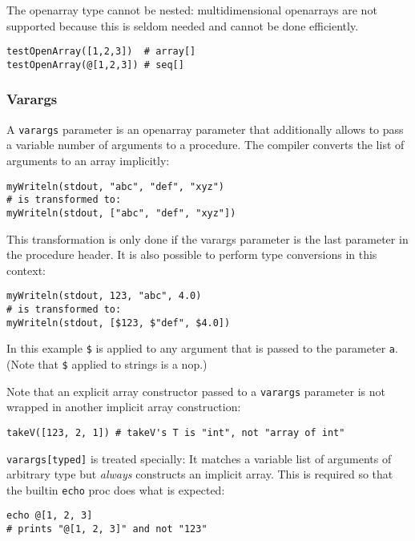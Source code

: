 The openarray type cannot be nested: multidimensional openarrays are not
supported because this is seldom needed and cannot be done efficiently.

\begin{verbatim}
testOpenArray([1,2,3])  # array[]
testOpenArray(@[1,2,3]) # seq[]
\end{verbatim}

\hypertarget{varargs}{%
\subsubsection{Varargs}\label{varargs}}

A \texttt{varargs} parameter is an openarray parameter that additionally
allows to pass a variable number of arguments to a procedure. The
compiler converts the list of arguments to an array implicitly:

\begin{verbatim}
myWriteln(stdout, "abc", "def", "xyz")
# is transformed to:
myWriteln(stdout, ["abc", "def", "xyz"])
\end{verbatim}

This transformation is only done if the varargs parameter is the last
parameter in the procedure header. It is also possible to perform type
conversions in this context:

\begin{verbatim}
myWriteln(stdout, 123, "abc", 4.0)
# is transformed to:
myWriteln(stdout, [$123, $"def", $4.0])
\end{verbatim}

In this example \texttt{\$} is applied to any argument that is passed to
the parameter \texttt{a}. (Note that \texttt{\$} applied to strings is a
nop.)

Note that an explicit array constructor passed to a \texttt{varargs}
parameter is not wrapped in another implicit array construction:

\begin{verbatim}
takeV([123, 2, 1]) # takeV's T is "int", not "array of int"
\end{verbatim}

\texttt{varargs{[}typed{]}} is treated specially: It matches a variable
list of arguments of arbitrary type but \emph{always} constructs an
implicit array. This is required so that the builtin \texttt{echo} proc
does what is expected:

\begin{verbatim}
echo @[1, 2, 3]
# prints "@[1, 2, 3]" and not "123"
\end{verbatim}

